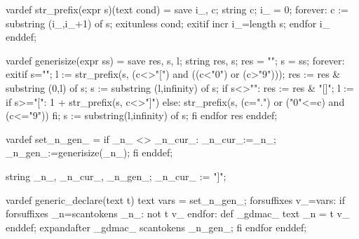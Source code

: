 \usemodule[animation]
\setupinteraction[state=start,click=off]

\startsymbolset[mysymbols]
\stopsymbolset

\setupanimation[symbolset=mysymbols]
\startMPinclusions


vardef str_prefix(expr s)(text cond) =
  save i_, c; string c;
  i_ = 0;
  forever:
    c := substring (i_,i_+1) of s;
    exitunless cond;
    exitif incr i_=length s;
  endfor
  i_
enddef;

vardef generisize(expr ss) =
  save res, s, l; string res, s;
  res = "";             %
  s = ss;               %
  forever: exitif s="";
    l := str_prefix(s, (c<>"[") and ((c<"0") or (c>"9")));
    res := res & substring (0,l) of s;
    s := substring (l,infinity) of s;
    if s<>"":
      res := res & "[]";
      l := if s>="[":  1 + str_prefix(s, c<>"]")
           else:  str_prefix(s, (c=".") or ("0"<=c) and (c<="9"))
           fi;
      s := substring(l,infinity) of s;
    fi
  endfor
  res
enddef;


vardef set_n_gen_ =
  if _n_ <> _n_cur_:
    _n_cur_:=_n_;
    _n_gen_:=generisize(_n_);
  fi
enddef;

string _n_, _n_cur_, _n_gen_;
_n_cur_ := "]";              %


vardef generic_declare(text t) text vars =
  set_n_gen_;
  forsuffixes v_=vars:
    if  forsuffixes _n=scantokens _n_: not t v_ endfor:
      def _gdmac_ text _n = t v_ enddef;
      expandafter _gdmac_ scantokens _n_gen_;
    fi
  endfor
enddef;

